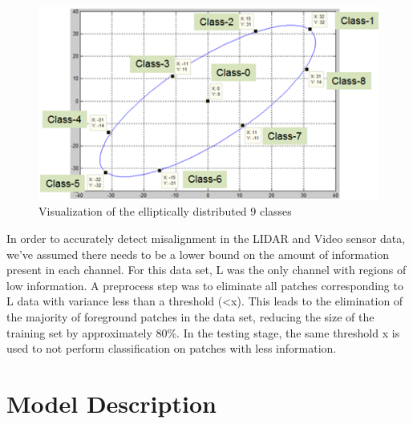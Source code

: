 \documentclass{article}
\begin{document}

\begin{figure}[htbp]
    \centering
        \includegraphics[scale=0.85]{Figures/ellipse.png}
    \caption{Visualization of the elliptically distributed 9 classes}
    \label{fig:Figures_Ellipse}
\end{figure}



In order to accurately detect misalignment in the LIDAR and Video sensor data, we've assumed there needs to be a lower bound on the amount of information present in each channel. For this data set, L was the only channel with regions of low information. A preprocess step was to eliminate all patches corresponding to L data with variance less than a threshold (\textless x). This leads to the elimination of the majority of foreground patches in the data set, reducing the size of the training set by approximately 80\%. In the testing stage, the same threshold x is used to not perform classification on patches with less information.



\section{Model Description} %
\label{sec:model_description}
\end{document}
